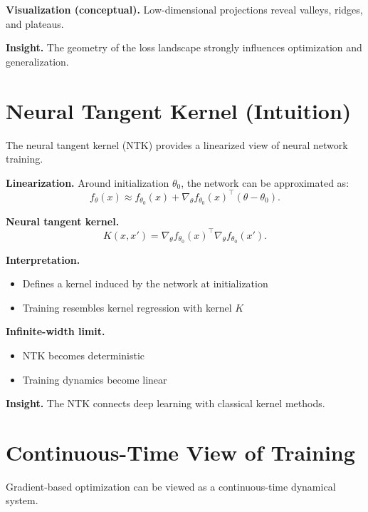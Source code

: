 \noindent
\textbf{Visualization (conceptual).}  
Low-dimensional projections reveal valleys, ridges, and plateaus.

\medskip

\noindent
\textbf{Insight.}  
The geometry of the loss landscape strongly influences optimization and generalization.

\section{Neural Tangent Kernel (Intuition)}

The neural tangent kernel (NTK) provides a linearized view of neural network training.

\medskip

\noindent
\textbf{Linearization.}  
Around initialization $\theta_0$, the network can be approximated as:
\[
f_\theta(x) \approx f_{\theta_0}(x) + \nabla_\theta f_{\theta_0}(x)^\top (\theta - \theta_0).
\]

\medskip

\noindent
\textbf{Neural tangent kernel.}
\[
K(x, x') = \nabla_\theta f_{\theta_0}(x)^\top \nabla_\theta f_{\theta_0}(x').
\]

\medskip

\noindent
\textbf{Interpretation.}
\begin{itemize}
    \item Defines a kernel induced by the network at initialization
    \item Training resembles kernel regression with kernel $K$
\end{itemize}

\medskip

\noindent
\textbf{Infinite-width limit.}
\begin{itemize}
    \item NTK becomes deterministic
    \item Training dynamics become linear
\end{itemize}

\medskip

\noindent
\textbf{Insight.}  
The NTK connects deep learning with classical kernel methods.

\section{Continuous-Time View of Training}

Gradient-based optimization can be viewed as a continuous-time dynamical system.

